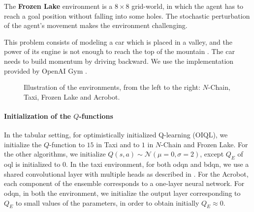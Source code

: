 The \textbf{Frozen Lake} environment is a $8\times 8$ grid-world, in which the agent has to reach a goal position without falling into some holes. The stochastic perturbation of the agent's movement makes the environment challenging.

This problem consists of modeling a car which is placed in a valley, and the power of its engine is not enough to reach the top of the mountain \cite{moore1990efficient}. The car needs to build momentum by driving backward. We use the implementation provided by OpenAI Gym \cite{brockman2016openai}.

\begin{figure*}[t]
  \centering
  \caption{Illustration of the environments, from the left to the right: $N$-Chain,  Taxi, Frozen Lake and Acrobot. }
\end{figure*}

\paragraph{Initialization of the $Q$-functions} In the tabular setting, for optimistically initialized Q-learning (OIQL), we initialize the $Q$-function to $15$ in Taxi and to $1$ in $N$-Chain and Frozen Lake. For the other algorithms, we initialize $Q(s,a) \sim \mathcal{N}(\mu=0,\sigma=2)$, except $Q_E$ of \gls{oql} is initialized to $0$.
In the taxi environment, for both \gls{odqn} and \gls{bdqn}, we use a shared convolutional layer with multiple heads as described in \cite{osband2016deep}. For the Acrobot, each component of the ensemble corresponds to a one-layer neural network. For \gls{odqn}, in both the environment, we initialize the output layer corresponding to $Q_E$ to small values of the parameters, in order to obtain initially $Q_E \approx 0$. 

